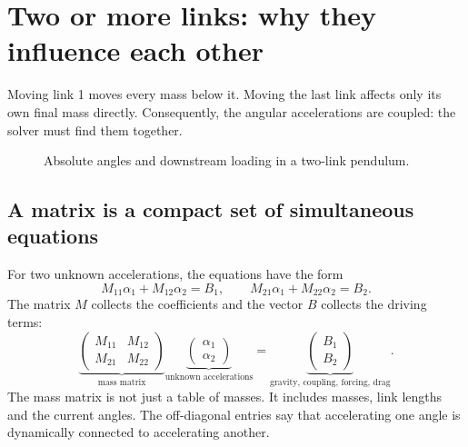 \documentclass[11pt,a4paper]{article}
\begin{document}
\section{Two or more links: why they influence each other}
Moving link 1 moves every mass below it. Moving the last link affects only its own final mass directly. Consequently, the angular accelerations are coupled: the solver must find them together.
\begin{figure}[H]\centering
{}\caption{Absolute angles and downstream loading in a two-link pendulum.}
\end{figure}
\subsection{A matrix is a compact set of simultaneous equations}
For two unknown accelerations, the equations have the form
\[
 M_{11}\alpha_1+M_{12}\alpha_2=B_1,\qquad
 M_{21}\alpha_1+M_{22}\alpha_2=B_2.
\]
The matrix \(M\) collects the coefficients and the vector \(B\) collects the driving terms:
\[
 \underbrace{\begin{pmatrix}M_{11}&M_{12}\\M_{21}&M_{22}\end{pmatrix}}_{\text{mass matrix}}
 \underbrace{\begin{pmatrix}\alpha_1\\\alpha_2\end{pmatrix}}_{\text{unknown accelerations}}
 =\underbrace{\begin{pmatrix}B_1\\B_2\end{pmatrix}}_{\text{gravity, coupling, forcing, drag}}.
\]
The mass matrix is not just a table of masses. It includes masses, link lengths and the current angles. The off-diagonal entries say that accelerating one angle is dynamically connected to accelerating another.
\end{document}
